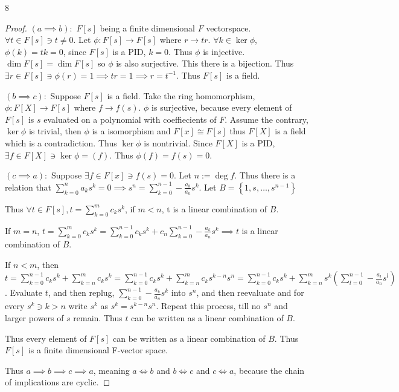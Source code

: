 \documentclass{article}
\begin{document}
\begin{PROB}{8}\label{Problem 8.}
\end{PROB}
\begin{proof}
    $(a \implies b):$ $F[s]$ being a finite dimensional $F$ vectorspace. $\forall t \in F[s] \ni t \neq 0$. Let $\phi: F[s] \to F[s]$ where $r \to tr$. $\forall k \in \ker \phi$, $\phi(k) = tk = 0$, since $F[s]$ is a PID, $k = 0$. Thus $\phi$ is injective. $\dim F[s] = \dim F[s]$ so $\phi$ is also surjective. This there is a bijection. Thus $\exists r \in F[s] \ni \phi(r) = 1 \implies tr = 1 \implies r = t^{-1}$. Thus $F[s]$ is a field. 
    
    $(b \implies c):$ Suppose $F[s]$ is a field. Take the ring homomorphism, $\phi: F[X] \to F[s]$ where $f \to f(s)$. $\phi$ is surjective, because every element of $F[s]$ is $s$ evaluated on a polynomial with coeffiecients of $F$. Assume the contrary, $\ker \phi$ is trivial, then $\phi$ is a isomorphism and $F[x]\cong F[s]$ thus $F[X]$ is a field which is a contradiction. Thus $\ker \phi$ is nontrivial. Since $F[X]$ is a PID, $\exists f \in F[X] \ni \ker \phi = (f)$. Thus $\phi(f) = f(s) = 0$. 
    
    $(c \implies a):$ Suppose $\exists f \in F[x] \ni f(s) = 0$. Let $n:= \deg f$. Thus there is a relation that $\sum_{k = 0}^{n}a_k s^k = 0 \implies s^n = \sum_{k = 0}^{n - 1} -\frac{a_k}{a_n} s^k$. Let $B = \left\{ 1, s, \dots, s^{n - 1} \right\}$  
    
    Thus $\forall t \in F[s], t = \sum_{k = 0}^{m} c_k s^k$, if $m < n$, t is a linear combination of $B$. 
    

    If $m = n$, $t = \sum_{k = 0}^{m} c_k s^k = \sum_{k = 0}^{n - 1} c_k s^k + c_n \sum_{k = 0}^{n - 1} -\frac{a_k}{a_n} s^k \implies t$ is a linear combination of $B$.    

    If $n < m$, then $t = \sum_{k = 0}^{n - 1} c_k s^k + \sum_{k = n}^m c_k s^k = \sum_{k = 0}^{n - 1} c_k s^k + \sum_{k = n}^m c_k s^{k - n} s^{n} = \sum_{k = 0}^{n - 1} c_k s^k + \sum_{k = n}^m s^k (\sum_{l = 0}^{n - 1} -\frac{a_l}{a_n} s^l)$. Evaluate $t$, and then replug, $\sum_{k = 0}^{n - 1} -\frac{a_k}{a_n} s^k$ into $s^n$, and then reevaluate and for every $s^k \ni k > n$ write $s^k$ as $s^k = s^{k - n}s^n$. Repeat this process, till no $s^n$ and larger powers of $s$ remain. Thus $t$ can be written as a linear combination of $B$.
    
    
    Thus every element of $F[s]$ can be written as a linear combination of $B$. Thus $F[s]$ is a finite dimensional F-vector space. 
    
    Thus $a \implies b \implies c \implies a$, meaning $a \iff b$ and $b \iff c$ and $c \iff a$, because the chain of implications are cyclic.     
\end{proof}
\end{document}
